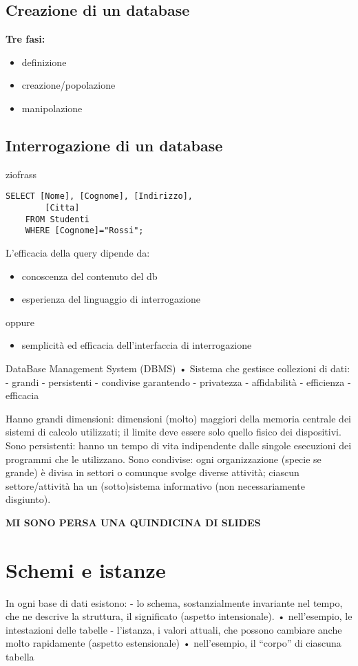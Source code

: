 \subsection{Creazione di un database}
\textbf{Tre fasi:}
\begin{itemize}
    \item definizione
    \item creazione/popolazione
    \item manipolazione
\end{itemize}

\subsection{Interrogazione di un database}
ziofrass
\begin{lstlisting}[mathescape=true]
    SELECT [Nome], [Cognome], [Indirizzo],
        [Citta]
    FROM Studenti
    WHERE [Cognome]="Rossi";
\end{lstlisting}

L'efficacia della query dipende da:
\begin{itemize}
    \item conoscenza del contenuto del db
    \item esperienza del linguaggio di interrogazione
\end{itemize}
oppure
\begin{itemize}
    \item semplicità ed efficacia dell'interfaccia di interrogazione
\end{itemize}

DataBase Management System
(DBMS)
• Sistema che gestisce collezioni di dati:
- grandi
- persistenti
- condivise
garantendo
- privatezza
- affidabilità
- efficienza
- efficacia

Hanno grandi dimensioni: dimensioni (molto) maggiori della memoria centrale dei sistemi di calcolo utilizzati; il limite deve essere solo quello fisico dei dispositivi.
Sono persistenti: hanno un tempo di vita indipendente dalle singole esecuzioni dei programmi che le utilizzano.
Sono condivise: ogni organizzazione (specie se grande) è divisa in settori o comunque svolge diverse attività; ciascun settore/attività ha un (sotto)sistema informativo (non necessariamente disgiunto).

\textbf{MI SONO PERSA UNA QUINDICINA DI SLIDES}

\section{Schemi e istanze}
In ogni base di dati esistono:
- lo schema, sostanzialmente invariante nel
tempo, che ne descrive la struttura, il
significato (aspetto intensionale).
• nell'esempio, le intestazioni delle tabelle
- l'istanza, i valori attuali, che possono
cambiare anche molto rapidamente (aspetto
estensionale)
• nell'esempio, il “corpo” di ciascuna tabella


